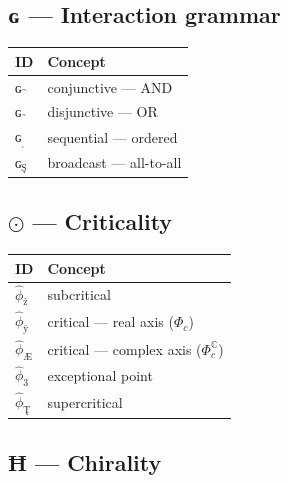\documentclass[12pt,a4paper]{article}
\begin{document}
\subsection{ɢ --- Interaction grammar}

\begin{table}[htbp]
\centering
\small
{}
\begin{tabularx}{\textwidth}{>{\centering\arraybackslash}X >{\centering\arraybackslash}X}
\toprule
\rowcolor{gray!25}\textbf{ID} & \textbf{Concept} \\
\midrule
\rowcolors{1}{white}{gray!10}
$ɢ_{\text{^}}$ & conjunctive --- AND \\
$ɢ_{\text{˝}}$ & disjunctive --- OR \\
$ɢ_{\text{ˌ}}$ & sequential --- ordered \\
$ɢ_{\text{Ş}}$ & broadcast --- all-to-all \\
\bottomrule
\end{tabularx}
\end{table}

\subsection{$\odot$ --- Criticality}

\begin{table}[htbp]
\centering
\small
{}
\begin{tabularx}{\textwidth}{>{\centering\arraybackslash}X >{\centering\arraybackslash}X}
\toprule
\rowcolor{gray!25}\textbf{ID} & \textbf{Concept} \\
\midrule
\rowcolors{1}{white}{gray!10}
$\hat{\phi}_{\text{ž}}$ & subcritical \\
$\hat{\phi}_{\text{ÿ}}$ & critical --- real axis ($\Phi_c$) \\
$\hat{\phi}_{\text{Æ}}$ & critical --- complex axis ($\Phi_c^\mathbb{C}$) \\
$\hat{\phi}_{3}$ & exceptional point \\
$\hat{\phi}_{\text{Ţ}}$ & supercritical \\
\bottomrule
\end{tabularx}
\end{table}

\subsection{Ħ --- Chirality}
\end{document}
